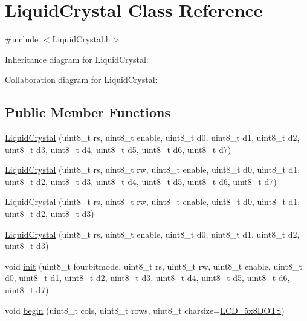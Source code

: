 \hypertarget{class_liquid_crystal}{}\section{Liquid\+Crystal Class Reference}
\label{class_liquid_crystal}


{\ttfamily \#include $<$Liquid\+Crystal.\+h$>$}



Inheritance diagram for Liquid\+Crystal\+:


Collaboration diagram for Liquid\+Crystal\+:
\subsection*{Public Member Functions}
\begin{DoxyCompactItemize}
\item 
\hyperlink{class_liquid_crystal_a49d2bd8d26031a1c83bcbd73978a1686}{Liquid\+Crystal} (uint8\+\_\+t rs, uint8\+\_\+t enable, uint8\+\_\+t d0, uint8\+\_\+t d1, uint8\+\_\+t d2, uint8\+\_\+t d3, uint8\+\_\+t d4, uint8\+\_\+t d5, uint8\+\_\+t d6, uint8\+\_\+t d7)
\item 
\hyperlink{class_liquid_crystal_a30e3d865c4b4a003a36cb45903f93644}{Liquid\+Crystal} (uint8\+\_\+t rs, uint8\+\_\+t rw, uint8\+\_\+t enable, uint8\+\_\+t d0, uint8\+\_\+t d1, uint8\+\_\+t d2, uint8\+\_\+t d3, uint8\+\_\+t d4, uint8\+\_\+t d5, uint8\+\_\+t d6, uint8\+\_\+t d7)
\item 
\hyperlink{class_liquid_crystal_a0a0a8dfa7a2e775a031fd65f5c6366ec}{Liquid\+Crystal} (uint8\+\_\+t rs, uint8\+\_\+t rw, uint8\+\_\+t enable, uint8\+\_\+t d0, uint8\+\_\+t d1, uint8\+\_\+t d2, uint8\+\_\+t d3)
\item 
\hyperlink{class_liquid_crystal_a23124e6dd5ac4a9b6147629b96e91953}{Liquid\+Crystal} (uint8\+\_\+t rs, uint8\+\_\+t enable, uint8\+\_\+t d0, uint8\+\_\+t d1, uint8\+\_\+t d2, uint8\+\_\+t d3)
\item 
void \hyperlink{class_liquid_crystal_ae45eec827b26174f73e9cf3ddda635af}{init} (uint8\+\_\+t fourbitmode, uint8\+\_\+t rs, uint8\+\_\+t rw, uint8\+\_\+t enable, uint8\+\_\+t d0, uint8\+\_\+t d1, uint8\+\_\+t d2, uint8\+\_\+t d3, uint8\+\_\+t d4, uint8\+\_\+t d5, uint8\+\_\+t d6, uint8\+\_\+t d7)
\item 
void \hyperlink{class_liquid_crystal_adb5f37d69809ed7c0772c74a4adff19b}{begin} (uint8\+\_\+t cols, uint8\+\_\+t rows, uint8\+\_\+t charsize=\hyperlink{_liquid_crystal_8h_a9ef57e724c1b846dae0f531aff6fb464}{L\+C\+D\+\_\+5x8\+D\+O\+TS})

\end{DoxyCompactItemize}
